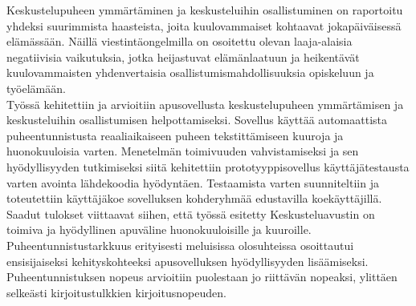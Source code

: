 \documentclass[english, 12pt, a4paper, pdftex, elec, utf8]{aaltothesis}
\begin{document}
\newpage

\begin{abstractpage}[finnish]
Keskustelupuheen ymmärtäminen ja keskusteluihin osallistuminen on raportoitu yhdeksi suurimmista haasteista, joita kuulovammaiset kohtaavat jokapäiväisessä elämässään. Näillä viestintäongelmilla on osoitettu olevan laaja-alaisia negatiivisia vaikutuksia, jotka heijastuvat elämänlaatuun ja heikentävät kuulovammaisten yhdenvertaisia osallistumismahdollisuuksia opiskeluun ja työelämään. \\

Työssä kehitettiin ja arvioitiin apusovellusta keskustelupuheen ymmärtämisen ja keskusteluihin osallistumisen helpottamiseksi. Sovellus käyttää automaattista puheentunnistusta reaaliaikaiseen puheen tekstittämiseen kuuroja ja huonokuuloisia varten. Menetelmän toimivuuden vahvistamiseksi ja sen hyödyllisyyden tutkimiseksi siitä kehitettiin prototyyppisovellus käyttäjätestausta varten avointa lähdekoodia hyödyntäen. Testaamista varten suunniteltiin ja toteutettiin käyttäjäkoe sovelluksen kohderyhmää edustavilla koekäyttäjillä. \\

Saadut tulokset viittaavat siihen, että työssä esitetty Keskusteluavustin on toimiva ja hyödyllinen apuväline huonokuuloisille ja kuuroille. Puheentunnistustarkkuus erityisesti meluisissa olosuhteissa osoittautui ensisijaiseksi kehityskohteeksi apusovelluksen hyödyllisyyden lisäämiseksi. Puheentunnistuksen nopeus arvioitiin puolestaan jo riittävän nopeaksi, ylittäen selkeästi kirjoitustulkkien kirjoitusnopeuden.
\end{abstractpage}

\newpage

\end{document}
